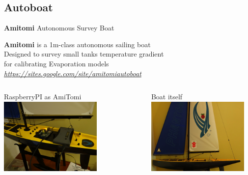 \documentclass[xcolor=dvipsnames,beamer]{beamer} %
\begin{document}
\subsection{Autoboat}
\begin{frame}[fragile]{{\bf Amitomi} Autonomous Survey Boat}

{\bf Amitomi} is a 1m-class autonomous sailing boat\\
Designed to survey small tanks temperature gradient\\
for calibrating Evaporation models\\
\vspace{5mm}
{\it \href{https://sites.google.com/site/amitomiautoboat}
{https://sites.google.com/site/amitomiautoboat}}
\begin{columns}[l]
\begin{center}
 RaspberryPI as AmiTomi\newline\linebreak
 \includegraphics[width=5cm]{sailbot000}
\end{center}
\begin{center}
 Boat itself\newline\linebreak
 \includegraphics[width=5cm]{sailbot001}
\end{center}

\end{columns}

\end{frame}
\end{document}
